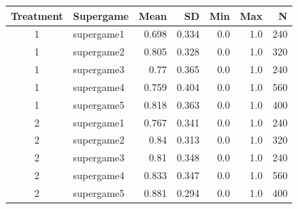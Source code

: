 \begin{tabular}{clrrrrr}
  \toprule
  Treatment & Supergame & Mean & SD & Min & Max & N \\ 
  \midrule
  1 & supergame1 & 0.698 & 0.334 & 0.0 & 1.0 & 240 \\ 
  1 & supergame2 & 0.805 & 0.328 & 0.0 & 1.0 & 320 \\ 
  1 & supergame3 & 0.77 & 0.365 & 0.0 & 1.0 & 240 \\ 
  1 & supergame4 & 0.759 & 0.404 & 0.0 & 1.0 & 560 \\ 
  1 & supergame5 & 0.818 & 0.363 & 0.0 & 1.0 & 400 \\ 
  2 & supergame1 & 0.767 & 0.341 & 0.0 & 1.0 & 240 \\ 
  2 & supergame2 & 0.84 & 0.313 & 0.0 & 1.0 & 320 \\ 
  2 & supergame3 & 0.81 & 0.348 & 0.0 & 1.0 & 240 \\ 
  2 & supergame4 & 0.833 & 0.347 & 0.0 & 1.0 & 560 \\ 
  2 & supergame5 & 0.881 & 0.294 & 0.0 & 1.0 & 400 \\ 
  \bottomrule
\end{tabular}
